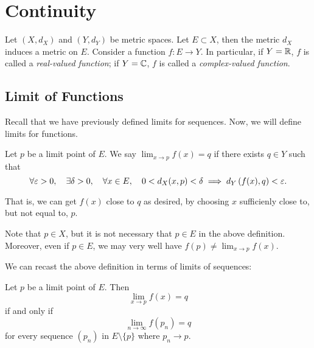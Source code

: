 \chapter{Continuity}\label{chap:real-analysis_continuity}
Let $(X,d_X)$ and $(Y,d_Y)$ be metric spaces. Let $E\subset X$, then the metric $d_X$ induces a metric on $E$. Consider a function $f\colon E\to Y$. 
In particular, if $Y=\mathbb R$, $f$ is called a \emph{real-valued function}; if $Y=\mathbb C$, $f$ is called a \emph{complex-valued function}.

\section{Limit of Functions}
Recall that we have previously defined limits for sequences. Now, we will define limits for functions.

\begin{definition}\label{defn:limit-function}
Let $p$ be a limit point of $E$. We say $\displaystyle\lim_{x\to p}f(x)=q$ if there exists $q\in Y$ such that
\[\forall\varepsilon>0,\quad\exists\delta>0,\quad\forall x\in E,\quad0<d_X(x,p)<\delta\implies d_Y\left(f(x),q\right)<\varepsilon.\]
\end{definition}

That is, we can get $f(x)$ close to $q$ as desired, by choosing $x$ sufficienly close to, but not equal to, $p$.

\begin{remark}
Note that $p\in X$, but it is not necessary that $p\in E$ in the above definition. Moreover, even if $p\in E$, we may very well have $\displaystyle f(p)\neq\lim_{x\to p}f(x)$.
\end{remark}

We can recast the above definition in terms of limits of sequences:
\begin{lemma}\label{lemma:limit-func-seq}
Let $p$ be a limit point of $E$. Then
\begin{equation*}\tag{I}
\lim_{x\to p}f(x)=q
\end{equation*}
if and only if
\begin{equation*}\tag{II}
\lim_{n\to\infty}f(p_n)=q
\end{equation*}
for every sequence $(p_n)$ in $E\setminus\{p\}$ where $p_n\to p$.
\end{lemma}


